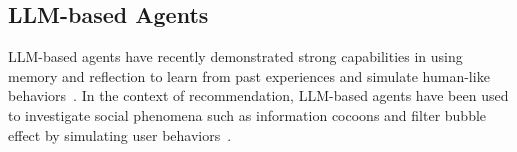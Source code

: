 \begin{table}
\centering
{}
\caption{Comparison of AgentDR and other recommendation methods.}
\label{tab_agentdr:salesman}
\end{table}


\subsection{LLM-based Agents}
LLM-based agents have recently demonstrated strong capabilities in using memory and reflection to learn from past experiences and simulate human-like behaviors~\cite{gao2025, ZhongGGYW24, ShinnCGNY23, ZhaoTZC024, ShiJQY24, LiDWCF24}. In the context of recommendation, LLM-based agents have been used to investigate social phenomena such as information cocoons and filter bubble effect by simulating user behaviors~\cite{recagent, agent4rec}.
